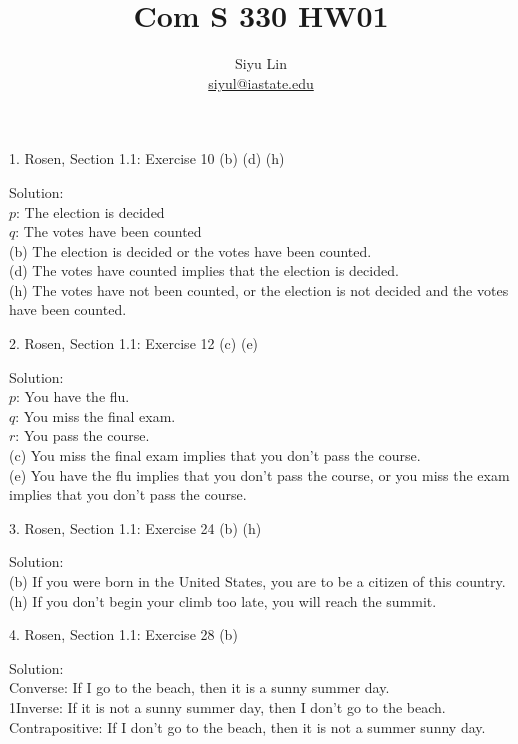 \documentclass{article}
\title{Com S 330 HW01}
\author{Siyu Lin\\ \url{siyul@iastate.edu}}
\begin{document}
\maketitle

1. Rosen, Section 1.1: Exercise 10 (b) (d) (h)

\indent Solution:\\
\indent $p$: The election is decided\\
\indent $q$: The votes have been counted\\
\indent (b) The election is decided or the votes have been counted.\\
\indent (d) The votes have counted implies that the election is decided.\\
\indent (h) The votes have not been counted, or the election is not decided and the votes have been counted.\\
\newline

2. Rosen, Section 1.1: Exercise 12 (c) (e)

\indent Solution:\\
\indent $p$: You have the flu.\\
\indent $q$: You miss the final exam.\\
\indent $r$: You pass the course.\\
\indent (c) You miss the final exam implies that you don’t pass the course.\\
\indent (e) You have the flu implies that you don’t pass the course, or you miss the exam implies that you don’t pass the course. \\
\newline

3. Rosen, Section 1.1: Exercise 24 (b) (h)

\indent Solution:\\
\indent (b) If you were born in the United States, you are to be a citizen of this country.\\
\indent (h) If you don’t begin your climb too late, you will reach the summit.\\
\newline

4. Rosen, Section 1.1: Exercise 28 (b)

\indent Solution:\\
\indent Converse: If I go to the beach, then it is a sunny summer day.\\
\indent 1Inverse: If it is not a sunny summer day, then I don’t go to the beach.\\
\indent Contrapositive: If I don’t go to the beach, then it is not a summer sunny day.\\
\newline
\end{document}
